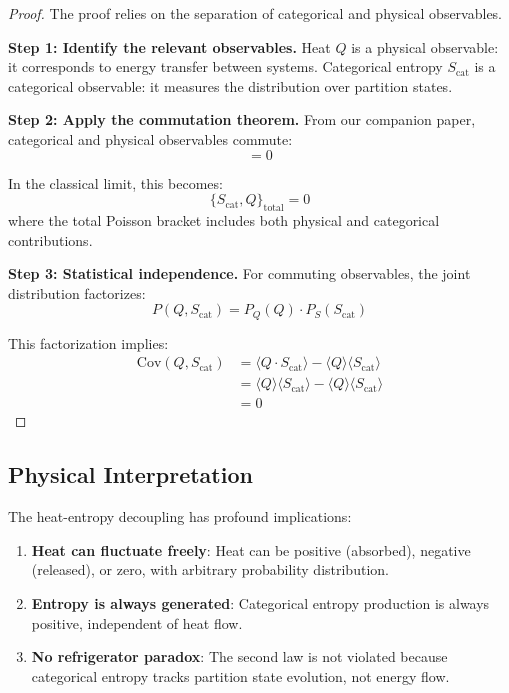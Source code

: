 \documentclass[twocolumn,10pt]{article}
\begin{document}
\begin{proof}
The proof relies on the separation of categorical and physical observables.

\textbf{Step 1: Identify the relevant observables.}
Heat $Q$ is a physical observable: it corresponds to energy transfer between systems. Categorical entropy $S_{\text{cat}}$ is a categorical observable: it measures the distribution over partition states.

\textbf{Step 2: Apply the commutation theorem.}
From our companion paper, categorical and physical observables commute:
\begin{equation}
    [\hat{O}_{\text{cat}}, \hat{O}_{\text{phys}}] = 0
\end{equation}

In the classical limit, this becomes:
\begin{equation}
    \{S_{\text{cat}}, Q\}_{\text{total}} = 0
\end{equation}
where the total Poisson bracket includes both physical and categorical contributions.

\textbf{Step 3: Statistical independence.}
For commuting observables, the joint distribution factorizes:
\begin{equation}
    P(Q, S_{\text{cat}}) = P_Q(Q) \cdot P_S(S_{\text{cat}})
\end{equation}

This factorization implies:
\begin{align}
    \text{Cov}(Q, S_{\text{cat}}) &= \langle Q \cdot S_{\text{cat}} \rangle - \langle Q \rangle \langle S_{\text{cat}} \rangle \\
    &= \langle Q \rangle \langle S_{\text{cat}} \rangle - \langle Q \rangle \langle S_{\text{cat}} \rangle \\
    &= 0
\end{align}
\end{proof}

\subsection{Physical Interpretation}

The heat-entropy decoupling has profound implications:

\begin{enumerate}
    \item \textbf{Heat can fluctuate freely}: Heat can be positive (absorbed), negative (released), or zero, with arbitrary probability distribution.

    \item \textbf{Entropy is always generated}: Categorical entropy production is always positive, independent of heat flow.

    \item \textbf{No refrigerator paradox}: The second law is not violated because categorical entropy tracks partition state evolution, not energy flow.
\end{enumerate}
\end{document}
